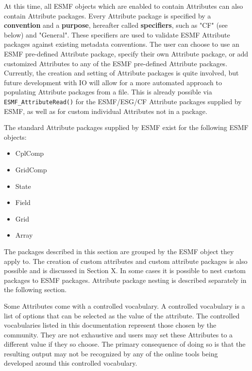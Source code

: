 %


\label{sec:AttPacks}

At this time, all ESMF objects which are enabled to contain Attributes can also contain Attribute packages.  Every Attribute package is specified by a {\bf convention} and a {\bf purpose}, hereafter called {\bf specifiers}, such as "CF" (see below) and "General".  These specifiers are used to validate ESMF Attribute packages against existing metadata conventions.  The user can choose to use an ESMF pre-defined Attribute package, specify their own Attribute package, or add customized Attributes to any of the ESMF pre-defined Attribute packages. Currently, the creation and setting of Attribute packages is quite involved, but future development with IO will allow for a more automated approach to populating Attribute packages from a file.  This is already possible via {\tt ESMF\_AttributeRead()} for the ESMF/ESG/CF Attribute packages supplied by ESMF, as well as for custom individual Attributes not in a package.

The standard Attribute packages supplied by ESMF exist for the following ESMF objects:

\begin{itemize}
    \item CplComp
    \item GridComp
    \item State
    \item Field
    \item Grid
    \item Array
\end{itemize}

The packages described in this section are grouped by the ESMF object they apply to. The creation of custom attributes and custom attribute packages is also possible and is discussed in Section X. In some cases it is possible to nest custom packages to ESMF packages. Attribute package nesting is described separately in the following section.  

Some Attributes come with a controlled vocabulary. A controlled vocabulary is a list of options that can be selected as the value of the attribute. The controlled vocabularies listed in this documentation represent those chosen by the community. They are not exhaustive and users may set these Attributes to a different value if they so choose. The primary consequence of doing so is that the resulting output may not be recognized by any of the online tools being developed around this controlled vocabulary.  

